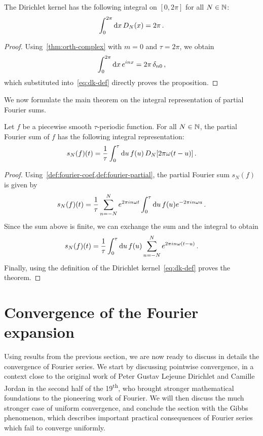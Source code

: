 \begin{proposition}
  \label{prop:dk-int}
  The Dirichlet kernel has the following integral on $[0,2\pi]$ for all $N\in\mathbb{N}$:
  \begin{equation}
    \int_0^{2\pi}\mathrm{d} x\,D_N(x)=2\pi\,.
  \end{equation}
\end{proposition}
\begin{proof}
  Using~\cref{thm:orth-complex} with $m=0$ and $\tau=2\pi$, we obtain
  \begin{equation}
    \int_{0}^{2\pi}\mathrm{d} x\,e^{inx}=2\pi\,\delta_{n0}\,,
  \end{equation}
  which substituted into~\cref{eq:dk-def} directly proves the proposition.
\end{proof}
We now formulate the main theorem on the integral representation of partial Fourier sums.
\begin{theorem}
  \label{thm:fourier-dk-rep}
  Let $f$ be a piecewise smooth $\tau$-periodic function. For all $N\in\mathbb{N}$, the partial
  Fourier sum of $f$ has the following integral representation:
  \begin{equation}
    s_N(f)(t)=\frac{1}{\tau}\int_0^{\tau}\mathrm{d} u\,f(u)\,D_N[2\pi\omega(t-u)]\,.
  \end{equation}
\end{theorem}
\begin{proof}
  Using~\cref{def:fourier-coef,def:fourier-partial}, the partial Fourier sum $s_N(f)$ is
  given by
  \begin{equation}
    s_N(f)(t)=\frac{1}{\tau}\sum_{n=-N}^{N}e^{2\pi i n\omega t}
    \int_0^\tau\mathrm{d} u\,f(u)e^{-2\pi i n\omega u}\,.
  \end{equation}
  Since the sum above is finite, we can exchange the sum and the integral to obtain
  \begin{equation}
    s_N(f)(t)=\frac{1}{\tau}\int_0^\tau\mathrm{d} u\,f(u)\sum_{n=-N}^{N}e^{2\pi i n\omega (t-u)}\,.
  \end{equation}
  Finally, using the definition of the Dirichlet kernel~\cref{eq:dk-def} proves the
  theorem.
\end{proof}
\section{Convergence of the Fourier expansion}
Using results from the previous section, we are now ready to discuss in details the
convergence of Fourier series. We start by discussing pointwise convergence, in a context
close to the original work of Peter Gustav Lejeune Dirichlet and Camille Jordan in the
second half of the 19\textsuperscript{th}, who brought stronger mathematical foundations
to the pioneering work of Fourier. We will then discuss the much stronger case of uniform
convergence, and conclude the section with the Gibbs phenomenon, which describes important
practical consequences of Fourier series which fail to converge uniformly.
